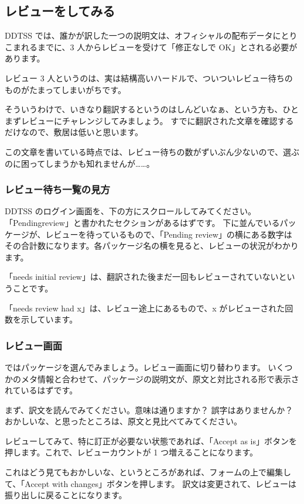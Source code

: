 \documentclass[mingoth,a4paper]{jsarticle}
\begin{document}
\subsection{レビューをしてみる}

DDTSS では、誰かが訳した一つの説明文は、オフィシャルの配布データにとりこまれるまでに、3 人からレビューを受けて「修正なしで OK」とされる必要があります。

レビュー 3 人というのは、実は結構高いハードルで、ついついレビュー待ちのものがたまってしまいがちです。

そういうわけで、いきなり翻訳するというのはしんどいなぁ、という方も、ひとまずレビューにチャレンジしてみましょう。
すでに翻訳された文章を確認するだけなので、敷居は低いと思います。

この文章を書いている時点では、レビュー待ちの数がずいぶん少ないので、選ぶのに困ってしまうかも知れませんが……。

\subsubsection{レビュー待ち一覧の見方}

DDTSS のログイン画面を、下の方にスクロールしてみてください。
「Pendingreview」と書かれたセクションがあるはずです。
下に並んでいるパッケージが、レビューを待っているもので、「Pending review」の横にある数字はその合計数になります。各パッケージ名の横を見ると、レビューの状況がわかります。

「needs initial review」は、翻訳された後まだ一回もレビューされていないということです。

「needs review had x」は、レビュー途上にあるもので、x がレビューされた回数を示しています。

\subsubsection{レビュー画面}

ではパッケージを選んでみましょう。レビュー画面に切り替わります。
いくつかのメタ情報と合わせて、パッケージの説明文が、原文と対比される形で表示されているはずです。

まず、訳文を読んでみてください。意味は通りますか？  誤字はありませんか？
おかしいな、と思ったところは、原文と見比べてみてください。

レビューしてみて、特に訂正が必要ない状態であれば、「Accept as is」ボタンを押します。これで、レビューカウントが 1 つ増えることになります。

これはどう見てもおかしいな、というところがあれば、フォームの上で編集して、「Accept with changes」ボタンを押します。
訳文は変更されて、レビューは振り出しに戻ることになります。
\end{document}
